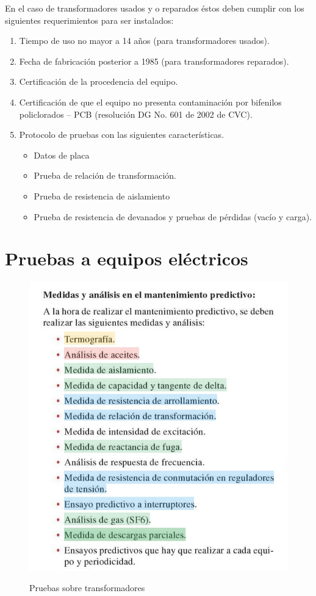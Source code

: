 \documentclass[a5paper]{book}%
\begin{document}
En el caso de transformadores usados y o reparados éstos deben cumplir con los siguientes requerimientos para ser instalados:

\begin{enumerate}
	\item Tiempo de uso no mayor a 14 años (para transformadores usados).
	\item Fecha de fabricación posterior a 1985 (para transformadores reparados).
	\item Certificación de la procedencia del equipo.
	\item Certificación de que el equipo no presenta contaminación por bifenilos policlorados – PCB (resolución DG No. 601 de 2002 de CVC).
	\item  Protocolo de pruebas con las siguientes características.
	\begin{itemize}
		\item Datos de placa
		\item  Prueba de relación de transformación.
		\item  Prueba de resistencia de aislamiento
		\item  Prueba de resistencia de devanados y pruebas de pérdidas (vacío y carga).
	\end{itemize}
      \end{enumerate}

      \section{Pruebas a equipos eléctricos}

\begin{figure}[H]
	\centering
	\caption{Pruebas sobre transformadores}
	\includegraphics[width=0.7\linewidth]{pruebas}
	\label{fig:pruebas}
\end{figure}
\end{document}
